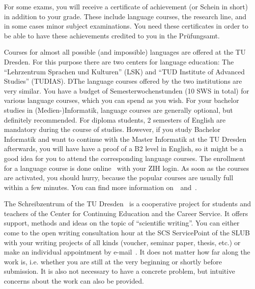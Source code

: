 
For some exams, you will receive a certificate of achievement (or Schein in short) in addition to your grade. These include language courses, the research line, and in some cases minor subject examinations. You need these certificates in order to be able to have these achievements credited to you in the Prüfungsamt.

\label{sec:sprachausbildung}

Courses for almost all possible (and impossible) languages are offered at the TU Dresden. For this purpose there are two centers for language education: The \enquote{Lehrzentrum Sprachen und Kulturen} (LSK) and \enquote{TUD Institute of Advanced Studies} (TUDIAS).
DThe language courses offered by the two institutions are very similar. You have a budget of Semesterwochenstunden (10 SWS in total) for various language courses, which you can spend as you wish. For your bachelor studies in (Medien-)Informatik, language courses are generally optional, but definitely recommended. For diploma students, 2 semesters of English are mandatory during the course of studies. However, if you study Bachelor Informatik and want to continue with the Master Informatik at the TU Dresden afterwards, you will have have a proof of a B2 level in English, so it might be a good idea for you to attend the corresponding language courses. The enrollment for a language course is done online~ with your ZIH login.
As soon as the courses are activated, you should hurry, because the popular courses are usually full within a few minutes. You can find more information on~~and~.


The Schreibzentrum of the TU Dresden~ is a cooperative project for students and teachers of the Center for Continuing Education and the Career Service. It offers support, methods and ideas on the topic of \enquote{scientific writing}.
You can either come to the open writing consultation hour at the SCS ServicePoint of the SLUB with your writing projects of all kinds (voucher, seminar paper, thesis, etc.) or make an individual appointment by e-mail~.
It does not matter how far along the work is, i.e. whether you are still at the very beginning or shortly before submission. It is also not necessary to have a concrete problem, but intuitive concerns about the work can also be provided.

